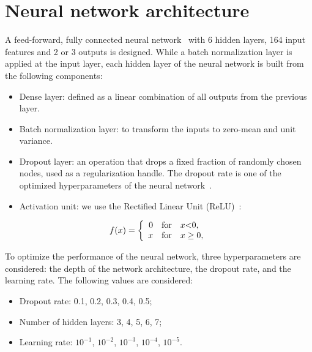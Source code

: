 \section{Neural network architecture}
\label{sec:dnn}

\par A feed-forward, fully connected neural network~\cite{hopfield1982neural} with 6 hidden layers, 164 input features and 2 or 3 outputs is designed. While a batch normalization layer is applied at the input layer, each hidden layer of the neural network is built from the following components:

\begin{itemize}
    \item Dense layer: defined as a linear combination of all outputs from the previous layer.
    \item Batch normalization layer: to transform the inputs to zero-mean and unit variance. ~\cite{DBLP:journals/corr/IoffeS15}
    \item Dropout layer: an operation that drops a fixed fraction of randomly chosen nodes, used as a regularization handle. The dropout rate is one of the optimized hyperparameters of the neural network~\cite{JMLR:v15:srivastava14a}.
    \item Activation unit: we use the Rectified Linear Unit (ReLU)~\cite{Pich:1998xt}:  
\end{itemize}

\begin{equation}
    f(x) = \left \{ \begin{array}{rcl}0 & \mbox{for} & x $<$ 0,\\ x & \mbox{for} & x \ge 0,\end{array} \right. \label{eq:relu}
\end{equation}

\par To optimize the performance of the neural network, three hyperparameters are considered: the depth of the network architecture, the dropout rate, and the learning rate. The following values are considered:

\begin{itemize}
    \item Dropout rate: 0.1, 0.2, 0.3, 0.4, 0.5;
    \item Number of hidden layers: 3, 4, 5, 6, 7;
    \item Learning rate: $10^{−1}$, $10^{−2}$, $10^{−3}$, $10^{−4}$, $10^{−5}$.
\end{itemize}

